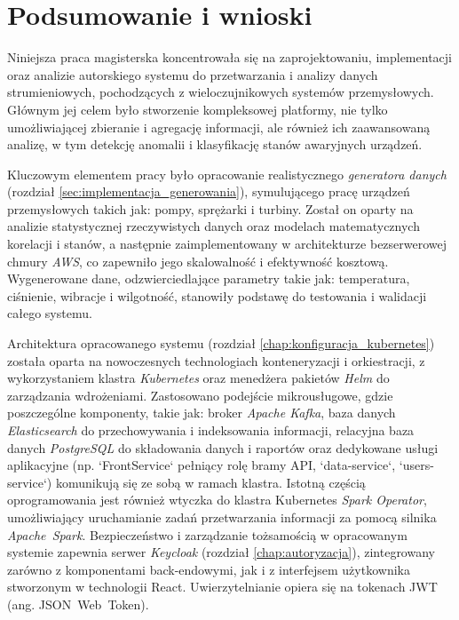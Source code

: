 \section{Podsumowanie i wnioski}
\label{sec:podsumowanie_wnioski}

Niniejsza praca magisterska koncentrowała się na zaprojektowaniu, implementacji oraz analizie autorskiego systemu do przetwarzania i analizy danych strumieniowych, pochodzących z wieloczujnikowych systemów przemysłowych. Głównym jej celem było stworzenie kompleksowej platformy, nie tylko umożliwiającej zbieranie i agregację informacji, ale również ich zaawansowaną analizę, w tym detekcję anomalii i klasyfikację stanów awaryjnych urządzeń.

Kluczowym elementem pracy było opracowanie realistycznego \textit{generatora danych} (rozdział \ref{sec:implementacja_generowania}), symulującego pracę urządzeń przemysłowych takich jak: pompy, sprężarki i turbiny. Został on oparty na analizie statystycznej rzeczywistych danych oraz modelach matematycznych korelacji i stanów, a następnie zaimplementowany w architekturze bezserwerowej chmury \textit{AWS}, co zapewniło jego skalowalność i efektywność kosztową. Wygenerowane dane, odzwierciedlające parametry takie jak: temperatura, ciśnienie, wibracje i wilgotność, stanowiły podstawę do testowania i walidacji całego systemu.

Architektura opracowanego systemu (rozdział \ref{chap:konfiguracja_kubernetes}) została oparta na nowoczesnych technologiach konteneryzacji i orkiestracji, z wykorzystaniem klastra \textit{Kubernetes} oraz menedżera pakietów \textit{Helm} do zarządzania wdrożeniami. Zastosowano podejście mikrousługowe, gdzie poszczególne komponenty, takie jak: broker \textit{Apache Kafka}, baza danych \textit{Elasticsearch} do przechowywania i indeksowania informacji, relacyjna baza danych \textit{PostgreSQL} do składowania danych i raportów oraz dedykowane usługi aplikacyjne (np. `FrontService` pełniący rolę bramy API, `data-service`, `users-service`) komunikują się ze sobą w ramach klastra. Istotną częścią oprogramowania jest również wtyczka do klastra Kubernetes \textit{Spark Operator}, umożliwiający uruchamianie zadań przetwarzania informacji za pomocą silnika \mbox{\textit{Apache Spark}}. Bezpieczeństwo i zarządzanie tożsamością w opracowanym systemie zapewnia serwer \textit{Keycloak} (rozdział \ref{chap:autoryzacja}), zintegrowany zarówno z komponentami back-endowymi, jak i z interfejsem użytkownika stworzonym w technologii React. Uwierzytelnianie opiera się na tokenach JWT (ang. \mbox{JSON Web Token}).

